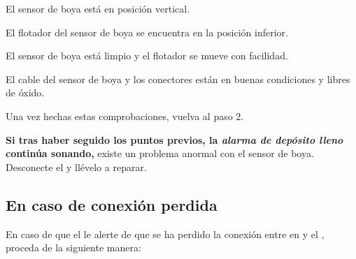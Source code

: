 \begin{enumeratecompact}
\begin{itemizecompact}
\begin{itemizecompact}

\item El sensor de boya está en posición vertical.

\item El flotador del sensor de boya se encuentra en la posición inferior.

\item El sensor de boya está limpio y el flotador se mueve con facilidad.

\item El cable del sensor de boya y los conectores están en buenas condiciones y libres de óxido.

\end{itemizecompact}

Una vez hechas estas comprobaciones, vuelva al paso 2.

\end{itemizecompact}

\item \textbf{Si tras haber seguido los puntos previos, la \emph{alarma de depósito lleno} continúa sonando,} existe un problema anormal con el sensor de boya. Desconecte el \CMS y llévelo a reparar.

\end{enumeratecompact}

\subsection{En caso de conexión perdida}
\label{sec:conn-perdida}
En caso de que el \CMS le alerte de que se ha perdido la conexión entre en \MIE y el \MEE, proceda de la siguiente manera:

